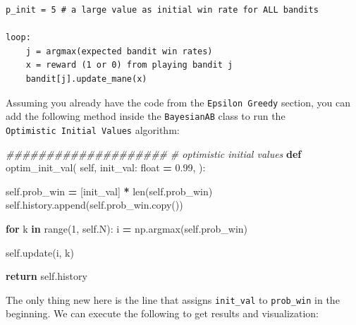 \documentclass[
]{book}
\newenvironment{Shaded}{\begin{snugshade}}{\end{snugshade}}
\newcommand{\BuiltInTok}[1]{#1}
\newcommand{\CommentTok}[1]{\textcolor[rgb]{0.56,0.35,0.01}{\textit{#1}}}
\newcommand{\ControlFlowTok}[1]{\textcolor[rgb]{0.13,0.29,0.53}{\textbf{#1}}}
\newcommand{\DecValTok}[1]{\textcolor[rgb]{0.00,0.00,0.81}{#1}}
\newcommand{\FloatTok}[1]{\textcolor[rgb]{0.00,0.00,0.81}{#1}}
\newcommand{\KeywordTok}[1]{\textcolor[rgb]{0.13,0.29,0.53}{\textbf{#1}}}
\newcommand{\NormalTok}[1]{#1}
\newcommand{\OperatorTok}[1]{\textcolor[rgb]{0.81,0.36,0.00}{\textbf{#1}}}
\newcommand{\VariableTok}[1]{\textcolor[rgb]{0.00,0.00,0.00}{#1}}
\theoremstyle{definition}
\theoremstyle{definition}
\theoremstyle{definition}
\theoremstyle{definition}
\theoremstyle{remark}
\begin{document}
\begin{verbatim}
p_init = 5 # a large value as initial win rate for ALL bandits

loop:
    j = argmax(expected bandit win rates)
    x = reward (1 or 0) from playing bandit j
    bandit[j].update_mane(x)
\end{verbatim}

Assuming you already have the code from the \texttt{Epsilon\ Greedy} section, you can add the following method inside the \texttt{BayesianAB} class to run the \texttt{Optimistic\ Initial\ Values} algorithm:

\begin{Shaded}
\begin{Highlighting}[]
    \CommentTok{\#\#\#\#\#\#\#\#\#\#\#\#\#\#\#\#\#\#\#\#}
    \CommentTok{\# optimistic initial values}
    \KeywordTok{def}\NormalTok{ optim\_init\_val(}
            \VariableTok{self}\NormalTok{,}
\NormalTok{            init\_val: }\BuiltInTok{float} \OperatorTok{=} \FloatTok{0.99}\NormalTok{,}
\NormalTok{    ):}

        \VariableTok{self}\NormalTok{.prob\_win }\OperatorTok{=}\NormalTok{ [init\_val] }\OperatorTok{*} \BuiltInTok{len}\NormalTok{(}\VariableTok{self}\NormalTok{.prob\_win)}
        \VariableTok{self}\NormalTok{.history.append(}\VariableTok{self}\NormalTok{.prob\_win.copy())}

        \ControlFlowTok{for}\NormalTok{ k }\KeywordTok{in} \BuiltInTok{range}\NormalTok{(}\DecValTok{1}\NormalTok{, }\VariableTok{self}\NormalTok{.N):}
\NormalTok{            i }\OperatorTok{=}\NormalTok{ np.argmax(}\VariableTok{self}\NormalTok{.prob\_win)}

            \VariableTok{self}\NormalTok{.update(i, k)}

        \ControlFlowTok{return} \VariableTok{self}\NormalTok{.history}
\end{Highlighting}
\end{Shaded}

The only thing new here is the line that assigns \texttt{init\_val} to \texttt{prob\_win} in the beginning. We can execute the following to get results and visualization:
\end{document}
